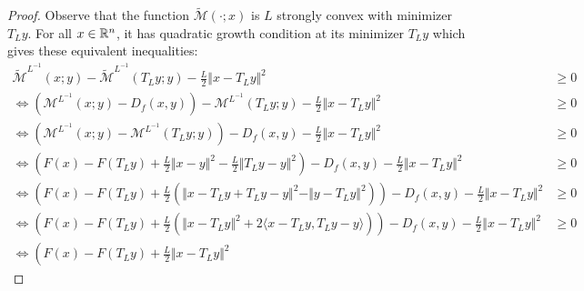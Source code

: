 \documentclass[12pt]{article}
\begin{document}
    \begin{proof}
        Observe that the function $\widetilde {\mathcal M}(\cdot; x)$ is $L$ strongly convex with minimizer $T_Ly$. 
        For all $x \in \mathbb R^n$, it has quadratic growth condition at its minimizer $T_Ly$ which gives these equivalent inequalities: 
        {\small
        \begin{align*}
            \widetilde{\mathcal M}^{L^{-1}}(x; y) - 
            \widetilde{\mathcal M}^{L^{-1}}(T_Ly; y)
            - 
            \frac{L}{2}\Vert x - T_Ly\Vert^2
            &\ge 
            0
            \\
            \iff
            \left(
                \mathcal M^{L^{-1}}(x; y) - D_f(x, y)
            \right) - 
            \mathcal M^{L^{-1}}(T_Ly; y) 
            - 
            \frac{L}{2}\Vert x - T_Ly\Vert^2
            &\ge 0
            \\
            \iff 
            \left(
                \mathcal M^{L^{-1}}(x; y)
                - 
                \mathcal M^{L^{-1}}(T_Ly; y)
            \right)
            - 
            D_f(x, y) 
            - \frac{L}{2}\Vert x - T_Ly\Vert^2
            &\ge 0
            \\
            \iff 
            \left(
                F(x) - F(T_Ly) 
                + 
                \frac{L}{2}\Vert x - y\Vert^2 - 
                \frac{L}{2}\Vert T_Ly - y\Vert^2
            \right)
            - 
            D_f(x, y) 
            - \frac{L}{2}\Vert x - T_Ly\Vert^2
            &\ge 0
            \\
            \iff 
            \left(
                F(x) - F(T_Ly) 
                + 
                \frac{L}{2}
                \left(
                    \Vert x - T_Ly + T_Ly - y\Vert^2
                    - 
                    \Vert y - T_Ly\Vert^2
                \right)
            \right)
            - 
            D_f(x, y) 
            - \frac{L}{2}\Vert x - T_Ly\Vert^2
            &\ge 0
            \\
            \iff 
            \left(
                F(x) - F(T_Ly) 
                + 
                \frac{L}{2}
                \left(
                    \Vert x - T_Ly\Vert^2 + 
                    2\langle x - T_Ly, T_Ly - y\rangle
                \right)
            \right)
            - 
            D_f(x, y) 
            - \frac{L}{2}\Vert x - T_Ly\Vert^2
            &\ge 0
            \\
            \iff
            \left(
                F(x) - F(T_Ly) + \frac{L}{2}\Vert x - T_Ly\Vert^2 

\end{align*}}
\end{proof}
\end{document}
